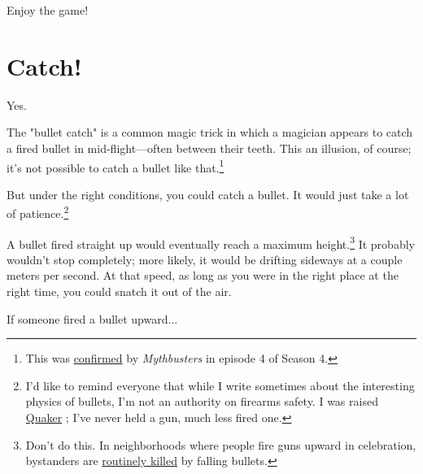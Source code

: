 {{Enjoy the game!}

{
\chapter{Catch!}
}

\hfill{}

{Yes.}

{The "bullet catch" is a common magic trick in which a magician appears to catch a fired bullet in mid-flight—often between their teeth. This an illusion, of course; it's not possible to catch a bullet like that.{\footnote{This was \href{http://www.discovery.com/tv-shows/mythbusters/mythbusters-database/catch-bullet-teeth.htm}{confirmed} by \emph{Mythbusters} in episode 4 of Season 4.} } }

{But under the right conditions, you could catch a bullet. It would just take a lot of patience.{\footnote{I'd like to remind everyone that while I write sometimes about the interesting physics of bullets, I'm not an authority on firearms safety. I was raised \href{http://en.wikipedia.org/wiki/Quakers}{Quaker} ; I've never held a gun, much less fired one.} } }

{A bullet fired straight up would eventually reach a maximum height.{\footnote{Don't do this. In neighborhoods where people fire guns upward in celebration, bystanders are \href{http://www.cdc.gov/mmwr/PDF/wk/mm5350.pdf}{routinely killed} by falling bullets.} } It probably wouldn't stop completely; more likely, it would be drifting sideways at a couple meters per second. At that speed, as long as you were in the right place at the right time, you could snatch it out of the air.}

{If someone fired a bullet upward...}

}

